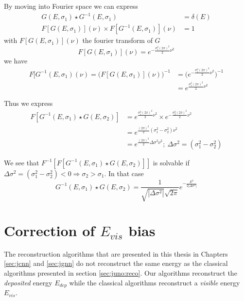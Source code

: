 \documentclass[../main.tex]{subfiles}
\begin{document}
By moving into Fourier space we can express
\begin{align}
  G(E, \sigma_1) \star G^{-1}(E, \sigma_1) &= \delta(E) \\
  F[G(E, \sigma_1)](\nu) \times F[G^{-1}(E, \sigma_1)](\nu) &= 1
\end{align}
with $F[G(E, \sigma_1)](\nu)$ the fourier transform of $G$
\begin{equation}
  F[G(E, \sigma_1)](\nu) = e^{-\frac{\sigma_1^2(2\pi)^2}{2}\nu^2}
\end{equation}
we have
\begin{align}
  F[G^{-1}(E, \sigma_1)(\nu) = \big( F[G(E, \sigma_1)](\nu) \big)^{-1} &= \big( e^{-\frac{\sigma_1^2(2\pi)^2}{2}\nu^2} \big)^{-1} \\
                                                                       &= e^{\frac{\sigma_1^2(2\pi)^2}{2}\nu^2}
\end{align}

Thus we express
\begin{align}
  F[G^{-1}(E, \sigma_1) \star G(E, \sigma_2)] &= e^{\frac{\sigma_1^2(2\pi)^2}{2}\nu^2} \times e^{-\frac{\sigma_2^2(2\pi)^2}{2}\nu^2} \\
                                              &= e^{\frac{(2\pi)^2}{2}(\sigma_1^2 - \sigma^2_2)\nu^2} \\
                                              &= e^{\frac{(2\pi)^2}{2}\Delta\sigma^2\nu^2}; ~ \Delta\sigma^2 = (\sigma_1^2 - \sigma^2_2)
\end{align}

We see that $F^{-1}[F[G^{-1}(E, \sigma_1) \star G(E, \sigma_2)]]$ is solvable if $\Delta\sigma^2 = (\sigma_1^2 - \sigma^2_2) < 0 \Rightarrow \sigma_2 > \sigma_1$. In that case
\begin{equation}
  G^{-1}(E, \sigma_1) \star G(E, \sigma_2) = \frac{1}{\sqrt{|\Delta \sigma^2|}\sqrt{2\pi}} e^{-\frac{E^2}{2|\Delta \sigma^2|}}
\end{equation}


\chapter{Correction of $E_{vis}$ bias}
\label{sec:annex:evis}

The reconstruction algorithms that are presented in this thesis in Chapters \ref{sec:jcnn} and \ref{sec:jgnn} do not reconstruct the same energy as the classical algorithms presented in section \ref{sec:juno:reco}. Our algorithms reconstruct the \textit{deposited} energy $E_{dep}$ while the classical algorithms reconstruct a \textit{visible} energy $E_{vis}$.
\end{document}
